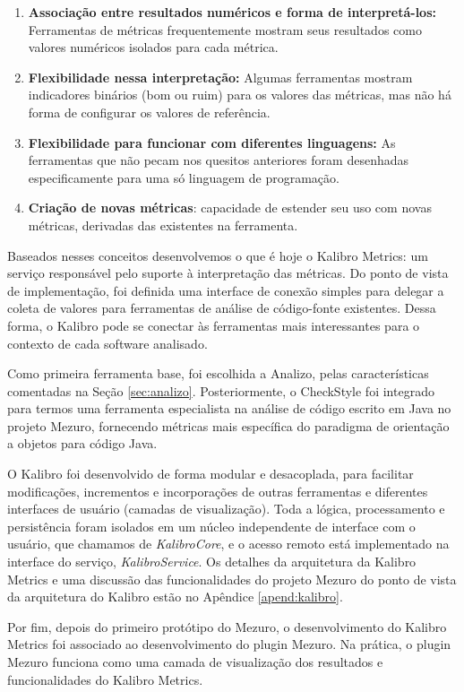 \begin{enumerate}

\item \textbf{Associação entre resultados numéricos e forma de interpretá-los:}
%
Ferramentas de métricas frequentemente mostram seus resultados como valores
numéricos isolados para cada métrica.

\item \textbf{Flexibilidade nessa interpretação:}
%
Algumas ferramentas mostram indicadores binários (bom ou ruim) para os valores
das métricas, mas não há forma de configurar os valores de referência.

\item \textbf{Flexibilidade para funcionar com diferentes linguagens:}
%
As ferramentas que não pecam nos quesitos anteriores foram desenhadas
especificamente para uma só linguagem de programação.

\item \textbf{Criação de novas métricas}: capacidade de estender seu uso com
novas métricas, derivadas das existentes na ferramenta.

\end{enumerate}

Baseados nesses conceitos desenvolvemos o que é hoje o Kalibro Metrics:
um serviço responsável pelo suporte à interpretação das métricas.
%
Do ponto de vista de implementação, foi definida uma interface de conexão
simples para delegar a coleta de valores para ferramentas de análise de
código-fonte existentes.
%
Dessa forma, o Kalibro pode se conectar às ferramentas mais interessantes
para o contexto de cada software analisado.

Como primeira ferramenta base, foi escolhida a Analizo, pelas características
comentadas na Seção \ref{sec:analizo}.
%
Posteriormente, o CheckStyle foi integrado para termos uma ferramenta
especialista na análise de código escrito em Java no projeto Mezuro, fornecendo
métricas mais específica do paradigma de orientação a objetos para código
Java.

O Kalibro foi desenvolvido de forma modular e desacoplada, para facilitar
modificações, incrementos e incorporações de outras ferramentas e diferentes
interfaces de usuário (camadas de visualização).
%
Toda a lógica, processamento e persistência foram isolados em um núcleo
independente de interface com o usuário, que chamamos de \textit {KalibroCore},
e o acesso remoto está implementado na interface do serviço,
\textit{KalibroService}.
%
Os detalhes da arquitetura da Kalibro Metrics e uma discussão das funcionalidades
do projeto Mezuro do ponto de vista da arquitetura do Kalibro estão no
Apêndice \ref{apend:kalibro}.

Por fim, depois do primeiro protótipo do Mezuro, o desenvolvimento do
Kalibro Metrics foi associado ao desenvolvimento do plugin Mezuro.
%
Na prática, o plugin Mezuro funciona como uma camada de visualização dos resultados e
funcionalidades do Kalibro Metrics.


